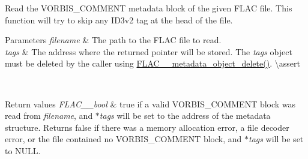 Read the V\+O\+R\+B\+I\+S\+\_\+\+C\+O\+M\+M\+E\+NT metadata block of the given F\+L\+AC file. This function will try to skip any I\+D3v2 tag at the head of the file.


\begin{DoxyParams}{Parameters}
{\em filename} & The path to the F\+L\+AC file to read. \\
\hline
{\em tags} & The address where the returned pointer will be stored. The {\itshape tags} object must be deleted by the caller using \mbox{\hyperlink{group__flac__metadata__object_ga66bbe27dba68ba77be5af83986a280ea}{F\+L\+A\+C\+\_\+\+\_\+metadata\+\_\+object\+\_\+delete()}}. \textbackslash{}assert 
\begin{DoxyCode}{1}
\end{DoxyCode}
 
\begin{DoxyCode}{1}
\end{DoxyCode}
 \\
\hline
\end{DoxyParams}

\begin{DoxyRetVals}{Return values}
{\em F\+L\+A\+C\+\_\+\+\_\+bool} & {\ttfamily true} if a valid V\+O\+R\+B\+I\+S\+\_\+\+C\+O\+M\+M\+E\+NT block was read from {\itshape filename}, and {\itshape $\ast$tags} will be set to the address of the metadata structure. Returns {\ttfamily false} if there was a memory allocation error, a file decoder error, or the file contained no V\+O\+R\+B\+I\+S\+\_\+\+C\+O\+M\+M\+E\+NT block, and {\itshape $\ast$tags} will be set to {\ttfamily N\+U\+LL}. \\
\hline
\end{DoxyRetVals}
